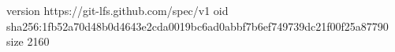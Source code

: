 version https://git-lfs.github.com/spec/v1
oid sha256:1fb52a70d48b0d4643e2cda0019bc6ad0abbf7b6ef749739dc21f00f25a87790
size 2160
